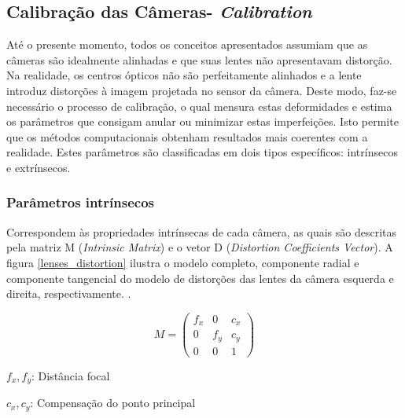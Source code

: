 \subsection{Calibração das Câmeras- \textit{Calibration}}

Até o presente momento, todos os conceitos apresentados assumiam que as câmeras são idealmente alinhadas e que suas lentes não apresentavam distorção. Na realidade, os centros ópticos não são perfeitamente alinhados e a lente introduz distorções à imagem projetada no sensor da câmera. Deste modo, faz-se necessário o processo de calibração, o qual mensura estas deformidades e estima os parâmetros que consigam anular ou minimizar estas imperfeições. Isto permite que os métodos computacionais obtenham resultados mais coerentes com a realidade.  Estes parâmetros são classificadas em dois tipos específicos: intrínsecos e extrínsecos.


\subsubsection{Parâmetros intrínsecos}

Correspondem às propriedades intrínsecas de cada câmera, as quais são descritas pela matriz M (\textit{Intrinsic Matrix}) e o vetor D (\textit{Distortion Coefficients Vector}). A figura \ref{lenses_distortion} ilustra o modelo completo, componente radial e componente tangencial do modelo de distorções das lentes da câmera esquerda e direita, respectivamente.
\cite{DevelopmentTeam2016}.

\begin{equation}
 M = \begin{pmatrix}
f_x & 0   & c_x\\ 
  0 & f_y & c_y\\ 
  0 & 0   & 1
\end{pmatrix}
\end{equation}

\begin{center}
  $f_x,f_y$: Distância focal
  
  $c_x,c_y$: Compensação do ponto principal
\end{center}

